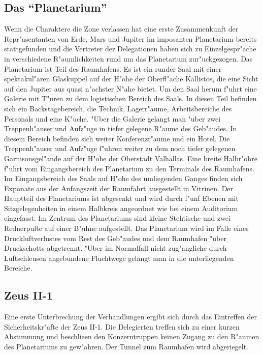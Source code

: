 
\subsection{Das "`Planetarium"'} 
Wenn die Charaktere die Zone verlassen hat eine erste Zusammenkunft der Repr"asentanten von Erde, Mars und Jupiter im imposanten Planetarium bereits stattgefunden und die Vertreter der Delegationen haben sich zu Einzelgespr"ache in verschiedene R"aumlichkeiten rund um das Planetarium zur"uckgezogen. Das Planetarium ist Teil des Raumhafens. Es ist ein runder Saal mit einer spektakul"aren Glaskuppel auf der H"ohe der Oberfl"ache Kallistos, die eine Sicht auf den Jupiter aus quasi n"achster N"ahe bietet. Um den Saal herum f"uhrt eine Galerie mit T"uren zu dem logistischen Bereich des Saals. In diesen Teil befinden sich ein Backstagebereich, die Technik, Lagerr"aume, Arbeitsbereiche des Personals und eine K"uche. "Uber die Galerie gelangt man "uber zwei Treppenh"auser und Aufz"uge in tiefer gelegene R"aume des Geb"audes. In diesem Bereich befinden sich weiter Konferenzr"aume und ein Hotel. Die Treppenh"auser und Aufz"uge f"uhren weiter zu dem noch tiefer gelegenen Garnisonsgel"ande auf der H"ohe der Oberstadt Valhallas. Eine breite Halbr"ohre f"uhrt vom Eingangsbereich des Planetarium zu den Terminals des Raumhafens. Im Eingangsbereich des Saals auf H"ohe des umliegenden Ganges finden sich Exponate aus der Anfangszeit der Raumfahrt ausgestellt in Vitrinen. Der Hauptteil des Planetariums ist abgesenkt und wird durch f"unf Ebenen mit Sitzgelegenheiten in einem Halbkreis angeordnet wie bei einem Auditorium eingefasst. Im Zentrum des Planetariums sind kleine Stehtische und zwei Rednerpulte auf einer B"uhne aufgestellt. Das Planetarium wird im Falle eines Druckluftverlustes vom Rest des Geb"audes und dem Raumhafen "uber Druckschotts abgetrennt. "Uber im Normalfall nicht zug"angliche durch Luftschleusen angebundene Fluchtwege gelangt man in die unterliegenden Bereiche.

\subsection{Zeus II-1} 
Eine erste Unterbrechung der Verhandlungen ergibt sich durch das Eintreffen der Sicherheitskr"afte der Zeus II-1. Die Delegierten treffen sich zu einer kurzen Abstimmung und beschlie\3en den Konzerntruppen keinen Zugang zu den R"aumen des Planetariums zu gew"ahren. Der Tunnel zum Raumhafen wird abgeriegelt. 

